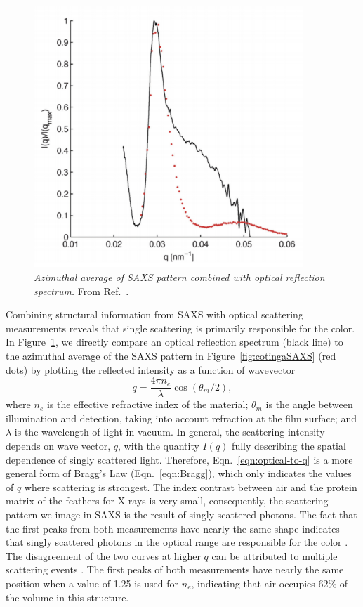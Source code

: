 \begin{figure}[htbp]
\centering
\includegraphics[width=4in]{figures/cmaynanacombined.pdf}
\caption{\label{fig:cotingacombined} \emph{Azimuthal average of SAXS pattern combined with optical reflection spectrum.}
	From Ref.~\cite{Dufresne:2009p6342}.}
\end{figure}

Combining structural information from SAXS with optical scattering measurements reveals that single scattering is primarily responsible for the color.
In Figure~\ref{fig:cotingacombined}, we directly compare an optical reflection spectrum (black line) to the azimuthal average of the SAXS pattern in Figure~\ref{fig:cotingaSAXS} (red dots) by plotting the reflected intensity as a function of wavevector 
\begin{equation}\label{eqn:optical-to-q}
q = \frac{4\pi n_{e}}{\lambda}\cos{(\theta_m/2)},
\end{equation}
where $n_{e}$ is the effective refractive index of the material;  $\theta_m$ is the angle between illumination and detection, taking into account refraction at the film surface; and $\lambda$ is the wavelength of light in vacuum.
In general, the scattering intensity depends on wave vector, $q$, with the quantity $I(q)$ fully describing the spatial dependence of singly scattered light.
Therefore, Eqn.~\ref{eqn:optical-to-q} is a more general form of Bragg's Law (Eqn.~\ref{eqn:Bragg}), which only indicates the values of $q$ where scattering is strongest.
The index contrast between air and the protein matrix of the feathers for X-rays is very small, consequently, the scattering pattern we image in SAXS is the result of singly scattered photons.
The fact that the first peaks from both measurements have nearly the same shape indicates that singly scattered photons in the optical range are responsible for the color \cite{Dufresne:2009p6342}.
The disagreement of the two curves at higher $q$ can be attributed to multiple scattering events \cite{Noh:2010}.
The first peaks of both measurements have nearly the same position when a value of 1.25 is used for $n_e$, indicating that air occupies 62\% of the volume in this structure.

